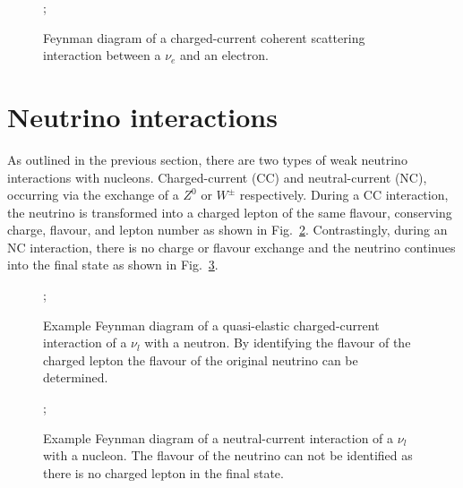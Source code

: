 \begin{figure} %
    ;
    \caption[$\nu_{e}$ coherent scattering Feynman diagram]
    {Feynman diagram of a charged-current coherent scattering interaction between a $\nu_{e}$ and
        an electron.}
    \label{fig:coherent_scattering}
\end{figure}

\section{Neutrino interactions} %
\label{sec:theory_interactions} %

As outlined in the previous section, there are two types of weak neutrino interactions with
nucleons. Charged-current (CC) and neutral-current (NC), occurring via the exchange of a $Z^{0}$
or $W^{\pm}$ respectively. During a CC interaction, the neutrino is transformed into a charged
lepton of the same flavour, conserving charge, flavour, and lepton number as shown in
Fig.~\ref{fig:cc_interaction}. Contrastingly, during an NC interaction, there is no charge or
flavour exchange and the neutrino continues into the final state as shown in
Fig.~\ref{fig:nc_interaction}.

\begin{figure} %
    ;
    \caption[Feynman diagram of a charged-current interaction]
    {Example Feynman diagram of a quasi-elastic charged-current interaction of a $\nu_{l}$ with a
        neutron. By identifying the flavour of the charged lepton the flavour of the original
        neutrino can be determined.}
    \label{fig:cc_interaction}
\end{figure}

\begin{figure} %
    ;
    \caption[Feynman diagram of a neutral-current interaction]
    {Example Feynman diagram of a neutral-current interaction of a $\nu_{l}$ with a nucleon. The
        flavour of the neutrino can not be identified as there is no charged lepton in the final
        state.}
    \label{fig:nc_interaction}
\end{figure}

